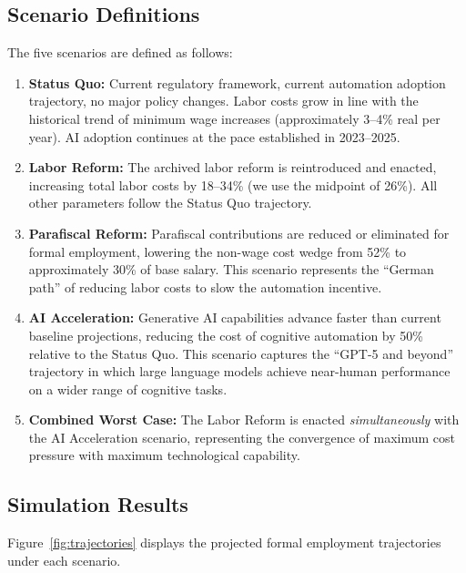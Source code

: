 \documentclass{article}
\begin{document}
\subsection{Scenario Definitions}
\label{subsec:scenario_definitions}

The five scenarios are defined as follows:

\begin{enumerate}[label=(\roman*)]
\item \textbf{Status Quo:} Current regulatory framework, current automation adoption trajectory, no major policy changes. Labor costs grow in line with the historical trend of minimum wage increases (approximately 3--4\% real per year). AI adoption continues at the pace established in 2023--2025.

\item \textbf{Labor Reform:} The archived labor reform is reintroduced and enacted, increasing total labor costs by 18--34\% (we use the midpoint of 26\%). All other parameters follow the Status Quo trajectory.

\item \textbf{Parafiscal Reform:} Parafiscal contributions are reduced or eliminated for formal employment, lowering the non-wage cost wedge from 52\% to approximately 30\% of base salary. This scenario represents the ``German path'' of reducing labor costs to slow the automation incentive.

\item \textbf{AI Acceleration:} Generative AI capabilities advance faster than current baseline projections, reducing the cost of cognitive automation by 50\% relative to the Status Quo. This scenario captures the ``GPT-5 and beyond'' trajectory in which large language models achieve near-human performance on a wider range of cognitive tasks.

\item \textbf{Combined Worst Case:} The Labor Reform is enacted \textit{simultaneously} with the AI Acceleration scenario, representing the convergence of maximum cost pressure with maximum technological capability.
\end{enumerate}

\subsection{Simulation Results}
\label{subsec:simulation_results}

Figure~\ref{fig:trajectories} displays the projected formal employment trajectories under each scenario.
\end{document}
